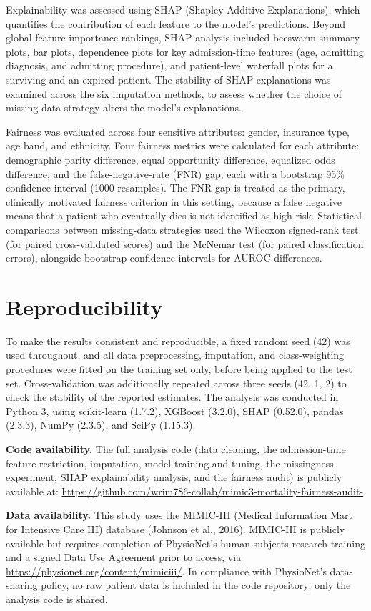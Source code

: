 \documentclass[12pt,a4paper]{report}
\begin{document}
Explainability was assessed using SHAP (Shapley Additive Explanations), which quantifies the contribution of each feature to the model's predictions. Beyond global feature-importance rankings, SHAP analysis included beeswarm summary plots, bar plots, dependence plots for key admission-time features (age, admitting diagnosis, and admitting procedure), and patient-level waterfall plots for a surviving and an expired patient. The stability of SHAP explanations was examined across the six imputation methods, to assess whether the choice of missing-data strategy alters the model's explanations.

Fairness was evaluated across four sensitive attributes: gender, insurance type, age band, and ethnicity. Four fairness metrics were calculated for each attribute: demographic parity difference, equal opportunity difference, equalized odds difference, and the false-negative-rate (FNR) gap, each with a bootstrap 95\% confidence interval (1000 resamples). The FNR gap is treated as the primary, clinically motivated fairness criterion in this setting, because a false negative means that a patient who eventually dies is not identified as high risk. Statistical comparisons between missing-data strategies used the Wilcoxon signed-rank test (for paired cross-validated scores) and the McNemar test (for paired classification errors), alongside bootstrap confidence intervals for AUROC differences.


\section{Reproducibility}
To make the results consistent and reproducible, a fixed random seed (42) was used throughout, and all data preprocessing, imputation, and class-weighting procedures were fitted on the training set only, before being applied to the test set. Cross-validation was additionally repeated across three seeds (42, 1, 2) to check the stability of the reported estimates. The analysis was conducted in Python 3, using scikit-learn (1.7.2), XGBoost (3.2.0), SHAP (0.52.0), pandas (2.3.3), NumPy (2.3.5), and SciPy (1.15.3).

\textbf{Code availability.} The full analysis code (data cleaning, the admission-time feature restriction, imputation, model training and tuning, the missingness experiment, SHAP explainability analysis, and the fairness audit) is publicly available at: \url{https://github.com/wrim786-collab/mimic3-mortality-fairness-audit-}.

\textbf{Data availability.} This study uses the MIMIC-III (Medical Information Mart for Intensive Care III) database (Johnson et al., 2016). MIMIC-III is publicly available but requires completion of PhysioNet's human-subjects research training and a signed Data Use Agreement prior to access, via \url{https://physionet.org/content/mimiciii/}. In compliance with PhysioNet's data-sharing policy, no raw patient data is included in the code repository; only the analysis code is shared.
\end{document}
